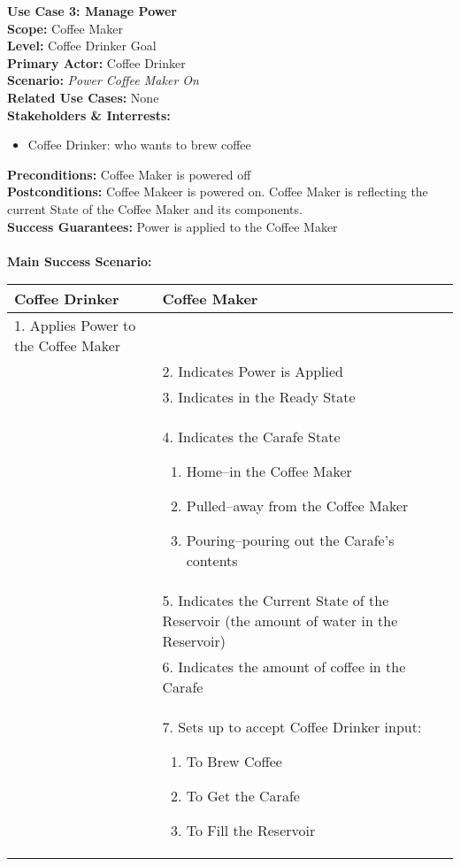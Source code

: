 \documentclass[letterpaper]{article}
\begin{document}
\noindent
\textbf{Use Case 3: Manage Power}\\
\textbf{Scope:  }Coffee Maker\\
\textbf{Level:  }Coffee Drinker Goal\\
\textbf{Primary Actor:  }Coffee Drinker\\
\textbf{Scenario: }\textit{Power Coffee Maker On}\\
\textbf{Related Use Cases:  }None\\
\textbf{Stakeholders \& Interrests:  }
\begin{itemize}
\item Coffee Drinker:  who wants to brew coffee
\end{itemize}
\textbf{Preconditions:  }Coffee Maker is powered off\\
\textbf{Postconditions:  }Coffee Makeer is powered on.  Coffee Maker
is reflecting the current State of the Coffee Maker and its
components.\\
\textbf{Success Guarantees:  }Power is applied to the Coffee Maker\\\\
\textbf{Main Success Scenario:  }\\
\begin{tabular}{|p{5.75cm}|p{5.75cm}|}\hline
\textbf{Coffee Drinker} & \textbf{Coffee Maker}\\\hline
1.  Applies Power to the Coffee Maker & \\\hline
& 2.  Indicates Power is Applied\\\hline
& 3.  Indicates in the Ready State\\\hline
& 4.  Indicates the Carafe State
\begin{enumerate}
\item Home--in the Coffee Maker
\item Pulled--away from the Coffee Maker
\item Pouring--pouring out the Carafe's contents
\end{enumerate}
\\\hline
& 5.  Indicates the Current State of the Reservoir (the amount of
water in the Reservoir)\\\hline
& 6.  Indicates the amount of coffee in the Carafe\\\hline
& 7.  Sets up to accept Coffee Drinker input:
\begin{enumerate}
\item To Brew Coffee
\item To Get the Carafe
\item To Fill the Reservoir
\end{enumerate}
\\\hline
\end{tabular}\\\\
\end{document}
